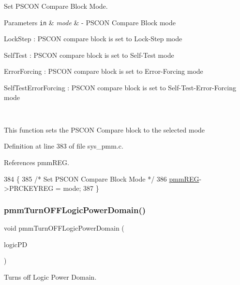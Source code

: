Set P\+S\+C\+ON Compare Block Mode. 


\begin{DoxyParams}[1]{Parameters}
\mbox{\tt in}  & {\em mode} & -\/ P\+S\+C\+ON Compare Block mode
\begin{DoxyItemize}
\item Lock\+Step \+: P\+S\+C\+ON compare block is set to Lock-\/\+Step mode
\item Self\+Test \+: P\+S\+C\+ON compare block is set to Self-\/\+Test mode
\item Error\+Forcing \+: P\+S\+C\+ON compare block is set to Error-\/\+Forcing mode
\item Self\+Test\+Error\+Forcing \+: P\+S\+C\+ON compare block is set to Self-\/\+Test-\/\+Error-\/\+Forcing mode
\end{DoxyItemize}\\
\hline
\end{DoxyParams}
This function sets the P\+S\+C\+ON Compare block to the selected mode 

Definition at line 383 of file sys\+\_\+pmm.\+c.



References pmm\+R\+EG.


\begin{DoxyCode}
384 \{
385     \textcolor{comment}{/* Set PSCON Compare Block Mode */}
386     \mbox{\hyperlink{reg__pmm_8h_a57b193bea1bf1951b97bdfee07f48598}{pmmREG}}->PRCKEYREG = mode;
387 \}
\end{DoxyCode}
\mbox{\label{group__PMM_ga567bb1ec4293b6160bd70fa919c37a54}} 
\subsubsection{\texorpdfstring{pmm\+Turn\+O\+F\+F\+Logic\+Power\+Domain()}{pmmTurnOFFLogicPowerDomain()}}
{\footnotesize\ttfamily void pmm\+Turn\+O\+F\+F\+Logic\+Power\+Domain (\begin{DoxyParamCaption}\item[{pmm\+\_\+\+Logic\+P\+D\+\_\+t}]{logic\+PD }\end{DoxyParamCaption})}



Turns off Logic Power Domain. 



